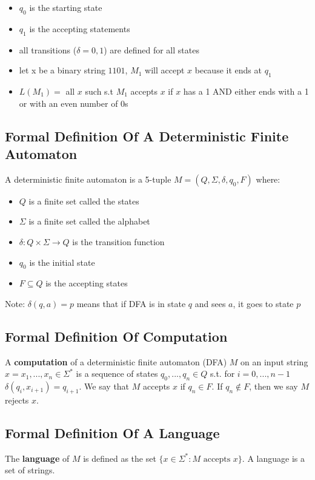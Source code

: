 \documentclass[11pt,a4paper]{article}
\begin{document}
\begin{itemize}
    \item $q_0$ is the starting state
    \item $q_1$ is the accepting statements
    \item all transitions ($\delta=0,1$) are defined for all states
    \item let x be a binary string $1101$, $M_1$ will accept $x$ because it ends at $q_1$
    \item $L(M_1)=$ all $x$ such s.t $M_1$ accepts $x$ if $x$ has a 1 AND either ends with a 1 or with an even number of 0s
\end{itemize}

\subsection{Formal Definition Of A Deterministic Finite Automaton}
\begin{definition}
    A deterministic finite automaton is a 5-tuple $M=(Q, \Sigma, \delta, q_0, F)$ where:
    \begin{itemize}
        \item $Q$ is a finite set called the states
        \item $\Sigma$ is a finite set called the alphabet
        \item $\delta: Q\times\Sigma\rightarrow Q$ is the transition function
        \item $q_0$ is the initial state
        \item $F\subseteq Q$ is the accepting states
    \end{itemize}
    Note: $\delta(q,a)=p$ means that if DFA is in state $q$ and sees $a$, it goes to state $p$
\end{definition}

\newpage
\subsection{Formal Definition Of Computation}
\begin{definition}
    A \textbf{computation} of a deterministic finite automaton (DFA) $M$ on an input string $x=x_1,...,x_n\in\Sigma^*$ is a sequence of states $q_0,...,q_n\in Q$ s.t. for $i=0,...,n-1$ $\delta(q_i,x_{i+1})=q_{i+1}$.
    We say that $M$ accepts $x$ if $q_n\in F$.
    If $q_n\notin F$, then we say $M$ rejects $x$.
\end{definition}

\subsection{Formal Definition Of A Language}
\begin{definition}
    The \textbf{language} of $M$ is defined as the set $\{x\in\Sigma^*: M\text{ accepts }x\}$.
    A language is a set of strings.
\end{definition}
\end{document}
